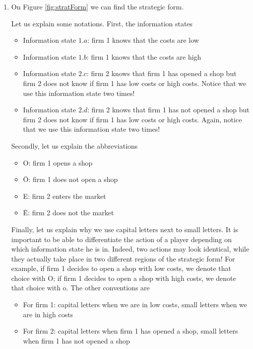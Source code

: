 \begin{enumerate}[label=\alph*.]

	\item On Figure \ref{fig:stratForm} we can find the strategic form.

	      


	      Let us explain some notations. First, the information states
	      \begin{itemize}
	      	\item Information state $1.a$: firm 1 knows that the costs are low
	      	\item Information state $1.b$: firm 1 knows that the costs are high
	      	\item Information state $2.c$: firm 2 knows that firm 1 has opened a shop but firm 2 does not know if firm 1 has low costs or high costs. Notice that we use this information state two times!
	      	\item Information state $2.d$: firm 2 knows that firm 1 has not opened a shop but firm 2 does not know if firm 1 has low costs or high costs. Again, notice that we use this information state two times!
	      \end{itemize}

	      Secondly, let us explain the abbreviations
	      \begin{itemize}
	      	\item O: firm 1 opens a shop
	      	\item \=O: firm 1 does not open a shop
	      	\item E: firm 2 enters the market
	      	\item \=E: firm 2 does not the market
	      \end{itemize}

	      Finally, let us explain why we use capital letters next to small letters. It is important to be able to differentiate the action of a player depending on which information state he is in. Indeed, two actions may look identical, while they actually take place in two different regions of the strategic form! For example, if firm 1 decides to open a shop with low costs, we denote that choice with O; if firm 1 decides to open a shop with high costs, we denote that choice with o. The other conventions are
	      \begin{itemize}
	      	\item For firm 1: capital letters when we are in low costs, small letters when we are in high costs
	      	\item For firm 2: capital letters when firm 1 has opened a shop, small letters when firm 1 has not opened a shop
	      \end{itemize}





\end{enumerate}

